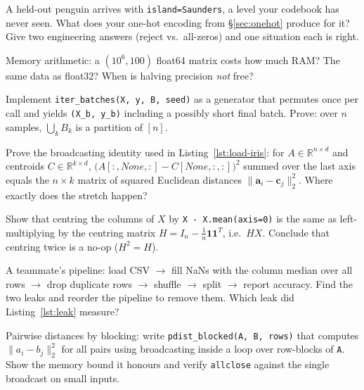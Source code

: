 \begin{exercise}[medium]
A held-out penguin arrives with \texttt{island=Saunders}, a level your
codebook has never seen. What does your one-hot encoding from
\S\ref{sec:onehot} produce for it? Give two engineering answers (reject vs.\
all-zeros) and one situation each is right.
\end{exercise}
\begin{exercise}[medium]
Memory arithmetic: a $(10^6, 100)$ float64 matrix costs how much RAM? The
same data as float32? When is halving precision \emph{not} free?
\end{exercise}
\begin{exercise}[hard]
Implement \texttt{iter\_batches(X, y, B, seed)} as a generator that permutes
once per call and yields \texttt{(X\_b, y\_b)} including a possibly short
final batch. Prove: over $n$ samples, $\bigcup_k B_k$ is a partition of
$[n]$.
\end{exercise}
\begin{exercise}[hard]
Prove the broadcasting identity used in Listing~\ref{lst:load-iris}: for
$A\in\mathbb R^{n\times d}$ and centroids $C\in\mathbb R^{k\times d}$,
$\bigl(A[:,None,:]-C[None,:,:]\bigr)^2$ summed over the last axis equals the
$n\times k$ matrix of squared Euclidean distances
$\|\mathbf a_i-\mathbf c_j\|_2^2$. Where exactly does the stretch happen?
\end{exercise}
\begin{exercise}[hard]
Show that centring the columns of $X$ by \texttt{X - X.mean(axis=0)} is the
same as left-multiplying by the centring matrix $H=I_n-\frac1n\mathbf
1\mathbf 1^T$, i.e.\ $HX$. Conclude that centring twice is a no-op
($H^2=H$).
\end{exercise}
\begin{exercise}[hard]
A teammate's pipeline: load CSV $\to$ fill NaNs with the column median over
all rows $\to$ drop duplicate rows $\to$ shuffle $\to$ split $\to$ report
accuracy. Find the two leaks and reorder the pipeline to remove them. Which
leak did Listing~\ref{lst:leak} measure?
\end{exercise}
\begin{exercise}[hard]
Pairwise distances by blocking: write \texttt{pdist\_blocked(A, B, rows)}
that computes $\|a_i-b_j\|_2^2$ for all pairs using broadcasting inside a
loop over row-blocks of \texttt{A}. Show the memory bound it honours and
verify \texttt{allclose} against the single broadcast on small inputs.
\end{exercise}

